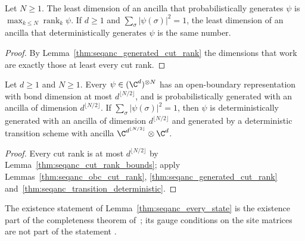 \begin{lemma}
    \label{thm:seqanc_minimal_resources}
    \leanok
    Let $N\ge 1$. The least dimension of an ancilla that probabilistically
    generates $\psi$ is $\max_{k\le N}\operatorname{rank}_k\psi$. If $d\ge 1$
    and $\sum_\sigma|\psi(\sigma)|^2=1$, the least dimension of an ancilla
    that deterministically generates $\psi$ is the same number.
\end{lemma}
\begin{proof}
    \leanok
    By Lemma~\ref{thm:seqanc_generated_cut_rank} the dimensions that work
    are exactly those at least every cut rank.
\end{proof}

\begin{lemma}
    \label{thm:seqanc_every_state}
    \leanok
    Let $d\ge 1$ and $N\ge 1$. Every $\psi\in(\C^d)^{\otimes N}$ has an
    open-boundary representation with bond dimension at most
    $d^{\lfloor N/2\rfloor}$, and is probabilistically generated with an
    ancilla of dimension $d^{\lfloor N/2\rfloor}$. If
    $\sum_\sigma|\psi(\sigma)|^2=1$, then $\psi$ is deterministically generated
    with an ancilla of dimension $d^{\lfloor N/2\rfloor}$ and generated by a
    deterministic transition scheme with ancilla
    $\C^{d^{\lfloor N/2\rfloor}}\otimes\C^d$.
\end{lemma}
\begin{proof}
    \leanok
    Every cut rank is at most $d^{\lfloor N/2\rfloor}$ by
    Lemma~\ref{thm:seqanc_cut_rank_bounds}; apply
    Lemmas~\ref{thm:seqanc_obc_cut_rank},
    \ref{thm:seqanc_generated_cut_rank}
    and~\ref{thm:seqanc_transition_deterministic}.
\end{proof}

\begin{remark}
    The existence statement of Lemma~\ref{thm:seqanc_every_state} is the
    existence part of the completeness theorem
    of~\cite[Section~3.1]{PerezGarcia2007Matrix}; its gauge conditions on the
    site matrices are not part of the statement
    \cite{gap:ssvcw05_sequential_bond_upper_bound_scope}.
\end{remark}


